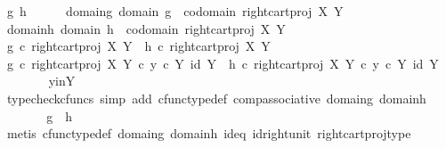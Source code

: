 \begin{isabellebody}
\ g\ h\isanewline
\ \ \ \ \isamarkupfalse%
\ domain{\isacharunderscore}{\kern0pt}g{\isacharcolon}{\kern0pt}\ {\isachardoublequoteopen}domain\ g\ {\isacharequal}{\kern0pt}\ codomain\ {\isacharparenleft}{\kern0pt}right{\isacharunderscore}{\kern0pt}cart{\isacharunderscore}{\kern0pt}proj\ X\ Y{\isacharparenright}{\kern0pt}{\isachardoublequoteclose}\isanewline
\ \ \ \ \isamarkupfalse%
\ domain{\isacharunderscore}{\kern0pt}h{\isacharcolon}{\kern0pt}\ {\isachardoublequoteopen}domain\ h\ {\isacharequal}{\kern0pt}\ codomain\ {\isacharparenleft}{\kern0pt}right{\isacharunderscore}{\kern0pt}cart{\isacharunderscore}{\kern0pt}proj\ X\ Y{\isacharparenright}{\kern0pt}{\isachardoublequoteclose}\isanewline
\ \ \ \ \isamarkupfalse%
\ {\isachardoublequoteopen}g\ {\isasymcirc}\isactrlsub c\ right{\isacharunderscore}{\kern0pt}cart{\isacharunderscore}{\kern0pt}proj\ X\ Y\ {\isacharequal}{\kern0pt}\ h\ {\isasymcirc}\isactrlsub c\ right{\isacharunderscore}{\kern0pt}cart{\isacharunderscore}{\kern0pt}proj\ X\ Y{\isachardoublequoteclose}\isanewline
\ \ \ \ \isamarkupfalse%
\ \isamarkupfalse%
\ {\isachardoublequoteopen}g\ {\isasymcirc}\isactrlsub c\ right{\isacharunderscore}{\kern0pt}cart{\isacharunderscore}{\kern0pt}proj\ X\ Y\ {\isasymcirc}\isactrlsub c\ {\isasymlangle}y\ {\isasymcirc}\isactrlsub c\ {\isasymbeta}\isactrlbsub Y\isactrlesub {\isacharcomma}{\kern0pt}\ id\ Y{\isasymrangle}\ {\isacharequal}{\kern0pt}\ h\ {\isasymcirc}\isactrlsub c\ right{\isacharunderscore}{\kern0pt}cart{\isacharunderscore}{\kern0pt}proj\ X\ Y\ {\isasymcirc}\isactrlsub c\ {\isasymlangle}y\ {\isasymcirc}\isactrlsub c\ {\isasymbeta}\isactrlbsub Y\isactrlesub {\isacharcomma}{\kern0pt}\ id\ Y{\isasymrangle}{\isachardoublequoteclose}\isanewline
\ \ \ \ \ \ \isamarkupfalse%
\ y{\isacharunderscore}{\kern0pt}in{\isacharunderscore}{\kern0pt}Y\ \isamarkupfalse%
\ {\isacharparenleft}{\kern0pt}typecheck{\isacharunderscore}{\kern0pt}cfuncs{\isacharcomma}{\kern0pt}\ simp\ add{\isacharcolon}{\kern0pt}\ cfunc{\isacharunderscore}{\kern0pt}type{\isacharunderscore}{\kern0pt}def\ comp{\isacharunderscore}{\kern0pt}associative\ domain{\isacharunderscore}{\kern0pt}g\ domain{\isacharunderscore}{\kern0pt}h{\isacharparenright}{\kern0pt}\isanewline
\ \ \ \ \isamarkupfalse%
\ \isamarkupfalse%
\ {\isachardoublequoteopen}g\ {\isacharequal}{\kern0pt}\ h{\isachardoublequoteclose}\isanewline
\ \ \ \ \ \ \isamarkupfalse%
\ {\isacharparenleft}{\kern0pt}metis\ cfunc{\isacharunderscore}{\kern0pt}type{\isacharunderscore}{\kern0pt}def\ domain{\isacharunderscore}{\kern0pt}g\ domain{\isacharunderscore}{\kern0pt}h\ id{\isacharunderscore}{\kern0pt}eq\ id{\isacharunderscore}{\kern0pt}right{\isacharunderscore}{\kern0pt}unit\ right{\isacharunderscore}{\kern0pt}cart{\isacharunderscore}{\kern0pt}proj{\isacharunderscore}{\kern0pt}type{\isacharparenright}{\kern0pt}\isanewline

\end{isabellebody}
